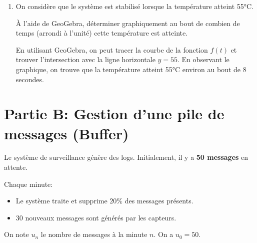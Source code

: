 \documentclass[11pt, a4paper]{report}
\begin{document}
\begin{enumerate}
    \medskip

    \item On considère que le système est stabilisé lorsque la température atteint 55°C.
    
    À l'aide de GeoGebra, déterminer graphiquement au bout de combien de temps (arrondi à l'unité) cette température est atteinte.
    
    \begin{blocvisiblex}[height=3]
        {\quad}
        En utilisant GeoGebra, on peut tracer la courbe de la fonction $f(t)$ et trouver l'intersection avec la ligne horizontale $y = 55$. En observant le graphique, on trouve que la température atteint 55°C environ au bout de 8 secondes.
    \end{blocvisiblex}
    
    \appelprof{}
\end{enumerate}

\pagebreak

\section*{Partie B\@: Gestion d'une pile de messages (Buffer) }


Le système de surveillance génère des logs. Initialement, il y a \textbf{50 messages} en attente.

Chaque minute:
\begin{itemize}
    \item Le système traite et supprime $20 \%$ des messages présents.
    \item 30 nouveaux messages sont générés par les capteurs.
\end{itemize}


On note $u_n$ le nombre de messages à la minute $n$. On a $u_0 = 50$.

\medskip
\end{document}
